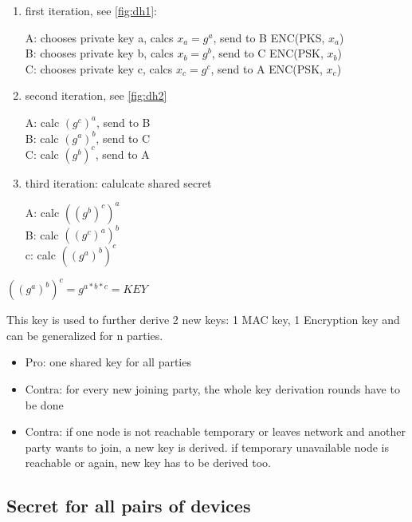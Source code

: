 \begin{enumerate}
 \item first iteration, see \ref{fig:dh1}:

A: chooses private key a, calcs $x_a = g^a$, send to B ENC(PKS, $x_a$)
\\
B: chooses private key b, calcs $x_b = g^b$, send to C ENC(PSK, $x_b$)
\\
C: chooses private key c, calcs $x_c = g^c$, send to A ENC(PSK, $x_c$)
\item second iteration, see \ref{fig:dh2}

A: calc $(g^c)^a$, send to B
\\
B: calc $(g^a)^b$, send to C
\\
C: calc $(g^b)^c$, send to A

\item third iteration: calulcate shared secret

A: calc $((g^b)^c)^a$
\\
B: calc $((g^c)^a)^b$
\\
c: calc $((g^a)^b)^c$

\end{enumerate}
$((g^a)^b)^c = g^{a*b*c} = KEY$

This key is used to further derive 2 new keys: 1 MAC key, 1 Encryption key and can be 
generalized for n parties. 

\begin{itemize}
 \item Pro: one shared key for all parties
 \item Contra: for every new joining party, the whole key derivation rounds have to be done
 \item Contra: if one node is not reachable temporary or leaves network and another party wants to join, a new 
 key is derived. if temporary unavailable node is reachable or again, new key has to be derived too.
\end{itemize}

\subsection{Secret for all pairs of devices}

